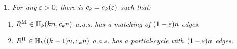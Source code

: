 \documentclass[11pt,english]{article}
\theoremstyle{plain}
\theoremstyle{definition}
\theoremstyle{definition}
\theoremstyle{plain}
\theoremstyle{plain}
\theoremstyle{plain}
\newtheorem{lem}[thm]{\protect\lemmaname}
\theoremstyle{plain}
\theoremstyle{remark}
\theoremstyle{remark}
\let\originalleft\left
\let\originalright\right
\renewcommand{\left}{\mathopen{}\mathclose\bgroup\originalleft}
\renewcommand{\right}{\aftergroup\egroup\originalright}
\providecommand{\lemmaname}{Lemma}
\begin{document}
\begin{lem}
\label{lem:hypergraph-almost-object}For any $\varepsilon>0$, there is $\b=\b\left(\varepsilon\right)$ such that:

\begin{enumerate}[topsep=0px,label=(\alph*)]

\item{\label{itm:hypergraph-large-matching}$R^{\mathrm{M}}\in\HH_{k}\left(kn,\bmat n\right)$
a.a.s. has a matching of $\left(1-\varepsilon\right)n$ edges.}

\item{\label{itm:hypergraph-large-subcycle}$R^{\mathrm{H}}\in\HH_{k}\left(\left(k-1\right)n,\bham n\right)$
a.a.s. has a partial-cycle with $\left(1-\varepsilon\right)n$ edges.}

\end{enumerate}\end{lem}
\end{document}
